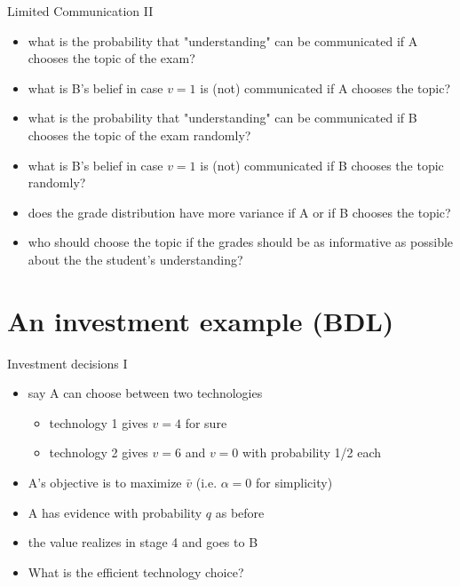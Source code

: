 \documentclass[bigger]{beamer}
\begin{document}
\begin{frame}[label={sec:orgheadline15}]{Limited Communication  II}
\begin{itemize}
\item what is the probability that "understanding" can be communicated if A chooses the topic of the exam?

\item what is B's belief in case \(v=1\) is (not) communicated if A chooses the topic?

\item what is the probability that "understanding" can be communicated if B chooses the topic of the exam randomly?

\item what is B's belief in case \(v=1\) is (not) communicated if B chooses the topic randomly?

\item does the grade distribution have more variance if A or if B chooses the topic?

\item who should choose the topic if the grades should be as informative as possible about the the student's understanding?
\end{itemize}
\end{frame}

\section{An investment example (BDL)}
\label{sec:orgheadline20}

\begin{frame}[label={sec:orgheadline17}]{Investment decisions I}
\begin{itemize}
\item say A can choose between two technologies
\begin{itemize}
\item technology 1 gives \(v=4\) for sure
\item technology 2 gives \(v=6\) and \(v=0\) with probability 1/2 each
\end{itemize}
\item A's objective is to maximize \(\bar{v}\) (i.e. \(\alpha=0\) for simplicity)
\item A has evidence with probability \(q\) as before
\item the value realizes in stage 4 and goes to B
\end{itemize}

\vspace*{0.5cm}
\begin{itemize}
\item What is the efficient technology choice?
\end{itemize}
\end{frame}
\end{document}

